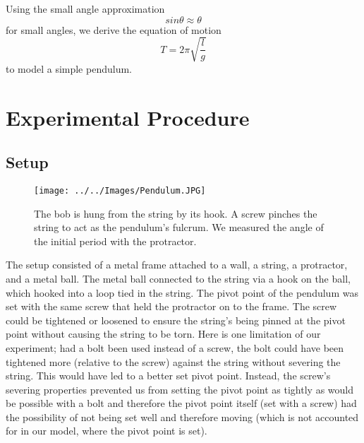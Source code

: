 \documentclass[iop]{emulateapj}
\begin{document}
Using the small angle approximation
\begin{equation}
\boxed{sin\theta \approx \theta}
\end{equation}
for small angles, we derive the equation of motion
\begin{equation}
\boxed{T = 2\pi\sqrt{\frac{l}{g}}}
\end{equation}
to model a simple pendulum.



\section{Experimental Procedure}
\label{sec:procedure}

\subsection{Setup}



\begin{figure}[H]
\centering
\texttt{[image: ../../Images/Pendulum.JPG]}
\caption{The bob is hung from the string by its hook. A screw pinches the string to act as
the pendulum's fulcrum. We measured the angle of the initial period with the 
protractor.}
\label{Pendulum}
\end{figure}



The setup consisted of a metal frame attached to a wall, a string, a 
protractor, and a metal 
ball.  The metal ball connected to the string via a hook on the ball, which 
hooked into a loop tied in the string.  The pivot point of the pendulum was 
set with the same screw that held the protractor on to the frame.  The screw 
could be tightened or loosened to ensure the string's being pinned at the 
pivot point without causing the string to be torn.  Here is one limitation of 
our experiment; had a bolt been used instead of a screw, the bolt could 
have been tightened more (relative to the screw) against the string without 
severing the string.  This would have led to a better set pivot point.  
Instead, the screw's severing properties prevented us from setting the 
pivot point as tightly as would be possible with a bolt and therefore the 
pivot point itself (set with a screw) had the possibility of not being set 
well and therefore moving (which is not accounted for in our model, where the 
pivot point is set).
\end{document}

